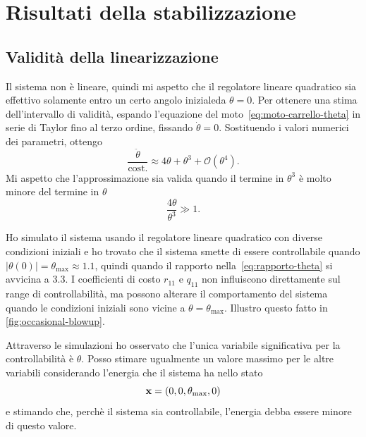 \section{Risultati della stabilizzazione}

\subsection{Validità della linearizzazione}
Il sistema non è lineare, quindi mi aspetto che il regolatore lineare quadratico sia
effettivo solamente entro un certo angolo iniziale\footnotemark da $\theta = 0$.
Per ottenere una stima dell'intervallo di validità, espando l'equazione del
moto~\eqref{eq:moto-carrello-theta} in serie di Taylor fino al terzo ordine,
fissando $\dot \theta = 0$.
Sostituendo i valori numerici dei parametri, ottengo
\begin{equation*}
    \frac {\ddot \theta} {\text{cost.}} \approx 4 \theta + \theta^3 + \mathcal O(\theta^4).
\end{equation*}
Mi aspetto che l'approssimazione sia valida quando il termine in $\theta^3$ è
molto minore del termine in $\theta$
\begin{equation}
    \frac{4\theta} {\theta^3} \gg 1.
    \label{eq:rapporto-theta}
\end{equation}

Ho simulato il sistema usando il regolatore lineare quadratico
con diverse condizioni iniziali e ho trovato che
il sistema smette di essere controllabile quando $|\theta(0)| = \theta_{\max} \approx 1.1$,
quindi quando il rapporto nella~\eqref{eq:rapporto-theta} si avvicina a $3.3$.
I coefficienti di costo $r_{11}$ e $q_{11}$ non influiscono
direttamente sul range di controllabilità, ma possono alterare
il comportamento del sistema quando le condizioni iniziali sono
vicine a $\theta = \theta_{\max}$.
Illustro questo fatto in \autoref{fig:occasional-blowup}.

Attraverso le simulazioni ho osservato che l'unica variabile
significativa per la controllabilità è $\theta$.
Posso stimare ugualmente un valore massimo per le altre
variabili considerando l'energia che il sistema ha nello stato
\begin{equation*}
    \mathbf{x} = (0, 0, \theta_{\max}, 0)
\end{equation*}
e stimando che, perchè il sistema sia controllabile,
l'energia debba essere minore di questo valore.

